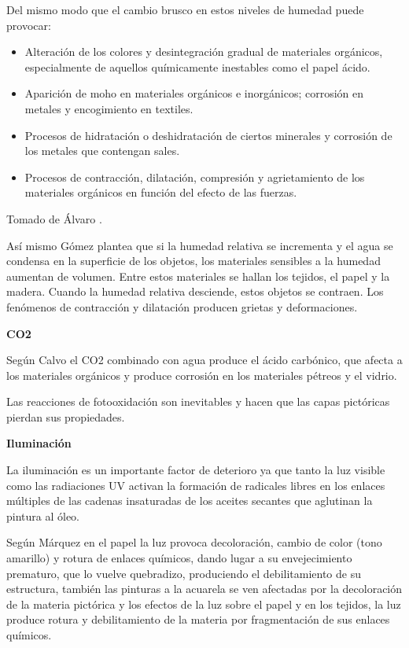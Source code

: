     Del mismo modo que el cambio brusco en estos niveles de humedad puede provocar:
    \begin{itemize}
        \item Alteración de los colores y desintegración gradual de materiales orgánicos, especialmente de aquellos químicamente inestables como el papel ácido.
        \item Aparición de moho en materiales orgánicos e inorgánicos; corrosión en metales y encogimiento en textiles.
        \item Procesos de hidratación o deshidratación de ciertos minerales y corrosión de los metales que contengan sales.
        \item Procesos de contracción, dilatación, compresión y agrietamiento de los materiales orgánicos en función del efecto de las fuerzas.
    \end{itemize}
    Tomado de Álvaro \cite{recioalvaroConservacionPreventivaExposiciones2020}.\vspace{0.5cm}

    Así mismo Gómez \cite{gomezcarreteroEfectosAcidoNitrico2015a} plantea que si la humedad relativa se incrementa y el agua se condensa en la superficie de los objetos, los materiales sensibles a la humedad aumentan de volumen. Entre estos materiales se hallan los tejidos, el papel y la madera. Cuando la humedad relativa desciende, estos objetos se contraen. Los fenómenos de contracción y dilatación producen grietas y deformaciones.

    \textbf{CO2}

    Según Calvo \cite{calvomanuelConservacionRestauracionPintura2002} el CO2 combinado con agua produce el ácido carbónico, que afecta a los materiales orgánicos y produce corrosión en los materiales pétreos y el vidrio.

    Las reacciones de fotooxidación son inevitables y hacen que las capas pictóricas pierdan sus propiedades.\cite{gomezcarreteroEfectosAcidoNitrico2015a}

    \textbf{Iluminación}

    La iluminación es un importante factor de deterioro ya que tanto la luz visible como las radiaciones UV activan la formación de radicales libres en los enlaces múltiples de las cadenas insaturadas de los aceites secantes que aglutinan la pintura al óleo.\cite{gomezcarreteroEfectosAcidoNitrico2015a}

    Según Márquez \cite{marquezAgentesDeterioroMedioambientales2016} en el papel la luz provoca decoloración, cambio de color (tono amarillo) y rotura de enlaces químicos, dando lugar a su envejecimiento prematuro, que lo vuelve quebradizo, produciendo el debilitamiento de su estructura, también las pinturas a la acuarela se ven afectadas por la decoloración de la materia pictórica y los efectos de la luz sobre el papel y en los tejidos, la luz produce rotura y debilitamiento de la materia por fragmentación de sus enlaces químicos.

